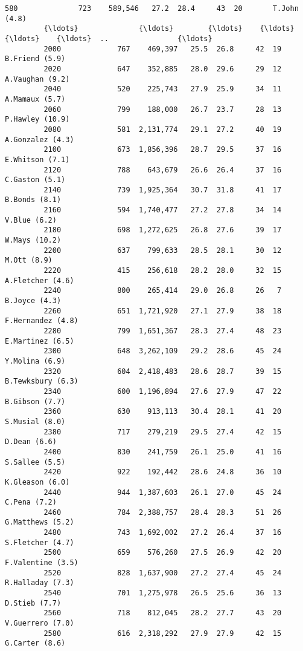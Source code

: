\documentclass[11pt]{article}
\begin{document}
\begin{Verbatim}[commandchars=\\\{\}]
         580              723    589,546   27.2  28.4     43  20       T.John (4.8)   
         {\ldots}              {\ldots}        {\ldots}    {\ldots}   {\ldots}    {\ldots}  ..                {\ldots}   
         2000             767    469,397   25.5  26.8     42  19     B.Friend (5.9)   
         2020             647    352,885   28.0  29.6     29  12    A.Vaughan (9.2)   
         2040             520    225,743   27.9  25.9     34  11     A.Mamaux (5.7)   
         2060             799    188,000   26.7  23.7     28  13    P.Hawley (10.9)   
         2080             581  2,131,774   29.1  27.2     40  19   A.Gonzalez (4.3)   
         2100             673  1,856,396   28.7  29.5     37  16    E.Whitson (7.1)   
         2120             788    643,679   26.6  26.4     37  16     C.Gaston (5.1)   
         2140             739  1,925,364   30.7  31.8     41  17      B.Bonds (8.1)   
         2160             594  1,740,477   27.2  27.8     34  14       V.Blue (6.2)   
         2180             698  1,272,625   26.8  27.6     39  17      W.Mays (10.2)   
         2200             637    799,633   28.5  28.1     30  12        M.Ott (8.9)   
         2220             415    256,618   28.2  28.0     32  15   A.Fletcher (4.6)   
         2240             800    265,414   29.0  26.8     26   7      B.Joyce (4.3)   
         2260             651  1,721,920   27.1  27.9     38  18  F.Hernandez (4.8)   
         2280             799  1,651,367   28.3  27.4     48  23   E.Martinez (6.5)   
         2300             648  3,262,109   29.2  28.6     45  24     Y.Molina (6.9)   
         2320             604  2,418,483   28.6  28.7     39  15  B.Tewksbury (6.3)   
         2340             600  1,196,894   27.6  27.9     47  22     B.Gibson (7.7)   
         2360             630    913,113   30.4  28.1     41  20     S.Musial (8.0)   
         2380             717    279,219   29.5  27.4     42  15       D.Dean (6.6)   
         2400             830    241,759   26.1  25.0     41  16     S.Sallee (5.5)   
         2420             922    192,442   28.6  24.8     36  10    K.Gleason (6.0)   
         2440             944  1,387,603   26.1  27.0     45  24       C.Pena (7.2)   
         2460             784  2,388,757   28.4  28.3     51  26   G.Matthews (5.2)   
         2480             743  1,692,002   27.2  26.4     37  16   S.Fletcher (4.7)   
         2500             659    576,260   27.5  26.9     42  20  F.Valentine (3.5)   
         2520             828  1,637,900   27.2  27.4     45  24   R.Halladay (7.3)   
         2540             701  1,275,978   26.5  25.6     36  13      D.Stieb (7.7)   
         2560             718    812,045   28.2  27.7     43  20   V.Guerrero (7.0)   
         2580             616  2,318,292   27.9  27.9     42  15     G.Carter (8.6)   
         

\end{Verbatim}
\end{document}
